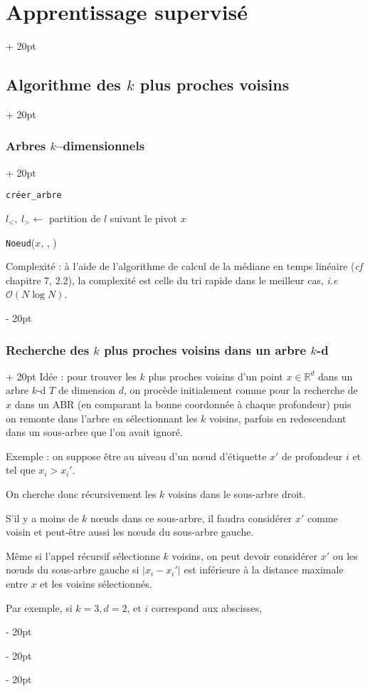 \documentclass[a4paper, 12pt, twoside]{article}
\newenvironment{indalgo}[2][H]{
    \begin{algoBox}
        \begin{algorithm}[#1]
            \caption{#2}
}
{
        \end{algorithm}
    \end{algoBox}
}
\newcommand{\R}{\mathbb{R}} %
\newcommand{\abs}[1]{\left\lvert #1 \right\rvert}
\newcommand{\ind}[1][20pt]{\advance\leftskip + #1}
\newcommand{\deind}[1][20pt]{\advance\leftskip - #1}
\newenvironment{indt}[2][20pt]{#2 \par \ind[#1]}{\par \deind} %
\begin{document}
\begin{indt}{\section{Apprentissage supervisé}}
\begin{indt}{\subsection{Algorithme des $k$ plus proches voisins}}
\begin{indt}{\subsubsection{Arbres $k$--dimensionnels}}
\begin{indalgo}{\texttt{créer\_arbre}}
{{                            $l_<,\ l_> \gets$ partition de $l$ suivant le pivot $x$\;

                            \Return \texttt{Noeud}($x$, , )\;
                        }
                    }
                \end{indalgo}

                Complexité : à l'aide de l'algorithme de calcul de la médiane en temps linéaire (\textit{cf} chapitre 7, 2.2), la complexité est celle du tri rapide dans le meilleur cas, \textit{i.e} $\mathcal O(N\log N)$.
            \end{indt}

            \vspace{12pt}
            
            \begin{indt}{\subsubsection{Recherche des $k$ plus proches voisins dans un arbre $k$-d}}
                Idée : pour trouver les $k$ plus proches voisins d'un point $x \in \R^d$ dans un arbre $k$-d $T$ de dimension $d$, on procède initialement comme pour la recherche de $x$ dans un ABR (en comparant la bonne coordonnée à chaque profondeur) puis on remonte dans l'arbre en sélectionnant les $k$ voisins, parfois en redescendant dans un sous-arbre que l'on avait ignoré.

                Exemple : on suppose être au niveau d'un n\oe ud d'étiquette $x'$ de profondeur $i$ et tel que $x_i > x_i'$.

                On cherche donc récursivement les $k$ voisins dans le sous-arbre droit.

                S'il y a moins de $k$ n\oe uds dans ce sous-arbre, il faudra considérer $x'$ comme voisin et peut-être aussi les n\oe uds du sous-arbre gauche.

                Même si l'appel récursif sélectionne $k$ voisins, on peut devoir considérer $x'$ ou les n\oe uds du sous-arbre gauche si $\abs{x_i - x_i'}$ est inférieure à la distance maximale entre $x$ et les voisins sélectionnés.

                Par exemple, si $k = 3, d = 2$, et $i$ correspond aux abscisses,

                \begin{center}
\end{center}
\end{indt}
\end{indt}
\end{indt}
\end{document}
